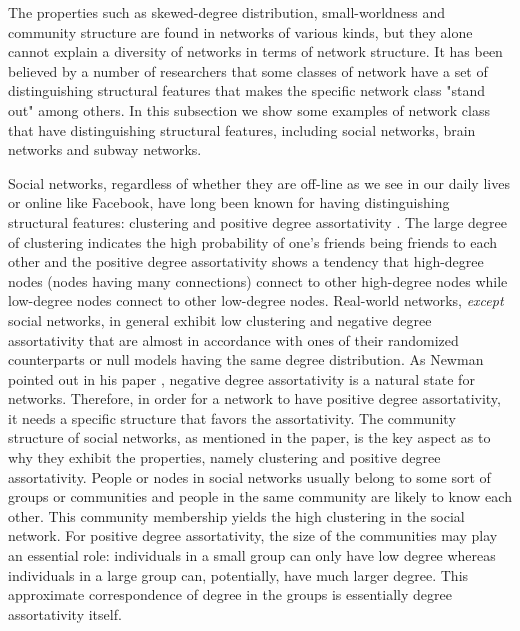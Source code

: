	
The properties such as skewed-degree distribution, small-worldness and community structure are found in networks of various kinds, but they alone cannot explain a diversity of networks in terms of network structure. It has been believed by a number of researchers that some classes of network have a set of distinguishing structural features that makes the specific network class "stand out" among others. In this subsection we show some examples of network class that have distinguishing structural features, including social networks, brain networks and subway networks.

Social networks, regardless of whether they are off-line as we see in our daily lives or online like Facebook, have long been known for having  distinguishing structural features: clustering and positive degree assortativity \cite{AssortativeMixing,WhySocialNetworks, Mislove:2007:OnlineSocial}. The large degree of clustering indicates the high probability of one's friends being friends to each other and the positive degree assortativity shows a tendency that high-degree nodes (nodes having many connections) connect to other high-degree nodes while low-degree nodes connect to other low-degree nodes. Real-world networks, \textit{except} social networks, in general exhibit low clustering and negative degree assortativity that are almost in accordance with ones of their randomized counterparts or null models having the same degree distribution. As Newman pointed out in his paper \cite{WhySocialNetworks}, negative degree assortativity is a natural state for networks. Therefore, in order for a network to have positive degree assortativity, it needs a specific structure that favors the assortativity. The community structure of social networks, as mentioned in the paper, is the key aspect as to why they exhibit the properties, namely clustering and positive degree assortativity. People or nodes in social networks usually belong to some sort of groups or communities and people in the same community are likely to know each other. This community membership yields the high clustering in the social network.  For positive degree assortativity, the size of the communities may play an essential role: individuals in a small group can only have low degree whereas individuals in a large group can, potentially, have much larger degree. This approximate correspondence of degree in the groups is essentially degree assortativity itself.


